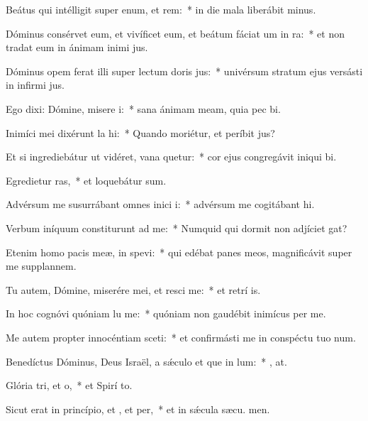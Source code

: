 \item Beátus qui intélligit super enum, et rem:~* in die mala liberábit  minus.
\item Dóminus consérvet eum, et vivíficet eum, et beátum fáciat um in ra:~* et non tradat eum in ánimam inimi jus.
\item Dóminus opem ferat illi super lectum doris jus:~* univérsum stratum ejus versásti in infirmi jus.
\item Ego dixi: Dómine, misere i:~* sana ánimam meam, quia pec bi.
\item Inimíci mei dixérunt la hi:~* Quando moriétur, et períbit  jus?
\item Et si ingrediebátur ut vidéret, vana quetur:~* cor ejus congregávit iniqui bi.
\item Egredietur ras,~* et loquebátur  sum.
\item Advérsum me susurrábant omnes inici i:~* advérsum me cogitábant  hi.
\item Verbum iníquum constiturunt ad me:~* Numquid qui dormit non adjíciet  gat?
\item Etenim homo pacis meæ, in  spevi:~* qui edébat panes meos, magnificávit super me supplannem.
\item Tu autem, Dómine, miserére mei, et resci me:~* et retrí is.
\item In hoc cognóvi quóniam lu me:~* quóniam non gaudébit inimícus  per me.
\item Me autem propter innocéntiam sceti:~* et confirmásti me in conspéctu tuo  num.
\item Benedíctus Dóminus, Deus Israël, a sǽculo et que in lum:~* , at.
\item Glória tri, et o,~* et Spirí to.
\item Sicut erat in princípio, et , et per,~* et in sǽcula sæcu. men.
